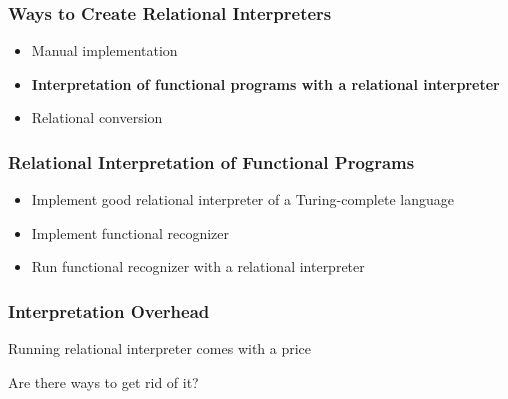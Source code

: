 \documentclass[xcolor=table]{beamer}
\begin{document}
\begin{frame}[fragile]
  \transwipe[direction=90]
  \frametitle{Ways to Create Relational Interpreters}
\begin{itemize}
	\item Manual implementation
	\item \textbf<2>{Interpretation of functional programs with a relational \linebreak interpreter}
	\item Relational conversion
\end{itemize}
\end{frame}

\begin{frame}[fragile]
  \transwipe[direction=90]
  \frametitle{Relational Interpretation of Functional Programs}
\begin{itemize}
	\item Implement good relational interpreter of a Turing-complete language
	\item Implement functional recognizer
	\item Run functional recognizer with a relational  interpreter
\end{itemize}
\end{frame}


\begin{frame}[fragile]
  \transwipe[direction=90]
  \frametitle{Interpretation Overhead}
\begin{center}
Running relational interpreter comes with a price
\end{center}


\begin{center}
Are there ways to get rid of it?
\end{center}

\end{frame}
\end{document}
